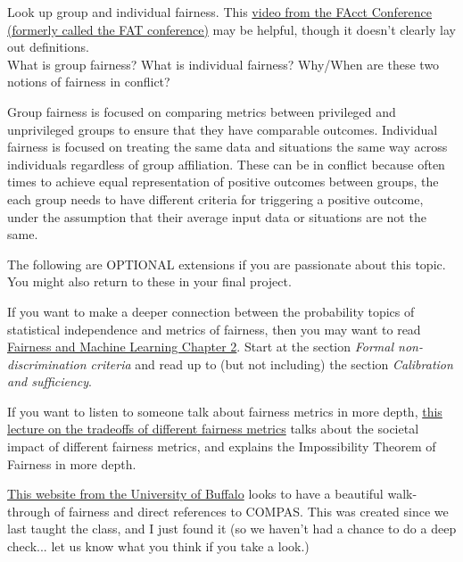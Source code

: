 \documentclass[assignment03_Solutions]{subfiles}
\begin{document}
\begin{exercise}
Look up group and individual fairness. This \href{https://www.youtube.com/watch?v=kok73C50RLA}{video from the FAcct Conference (formerly called the FAT conference)} may be helpful, though it doesn't clearly lay out definitions. \\

What is group fairness? What is individual fairness? Why/When are these two notions of fairness in conflict?
\begin{boxedsolution}
Group fairness is focused on comparing metrics between privileged and unprivileged groups to ensure that they have comparable outcomes. Individual fairness is focused on treating the same data and situations the same way across individuals regardless of group affiliation. These can be in conflict because often times to achieve equal representation of positive outcomes between groups, the each group needs to have different criteria for triggering a positive outcome, under the assumption that their average input data or situations are not the same.
\end{boxedsolution}
\end{exercise}

\begin{externalresources}
The following are OPTIONAL extensions if you are passionate about this topic. You might also return to these in your final project.

\bes
\item If you want to make a deeper connection between the probability topics of statistical independence and metrics of fairness, then you may want to read \href{https://fairmlbook.org/classification.html}{Fairness and Machine Learning Chapter 2}.  Start at the section \emph{Formal non-discrimination criteria} and read up to (but not including) the section \emph{Calibration and sufficiency}.

\item If you want to listen to someone talk about fairness metrics in more depth, \href{https://www.youtube.com/watch?v=jIXIuYdnyyk}{this lecture on the tradeoffs of different fairness metrics} talks about the societal impact of different fairness metrics, and explains the Impossibility Theorem of Fairness in more depth.

\item \href{http://www-student.cse.buffalo.edu/~atri/algo-and-society/support/notes/fairness/index.html}{This website from the University of Buffalo} looks to have a beautiful walk-through of fairness and direct references to COMPAS. This was created since we last taught the class, and I just found it (so we haven't had a chance to do a deep check... let us know what you think if you take a look.)
\ees
\end{externalresources}
\end{document}
